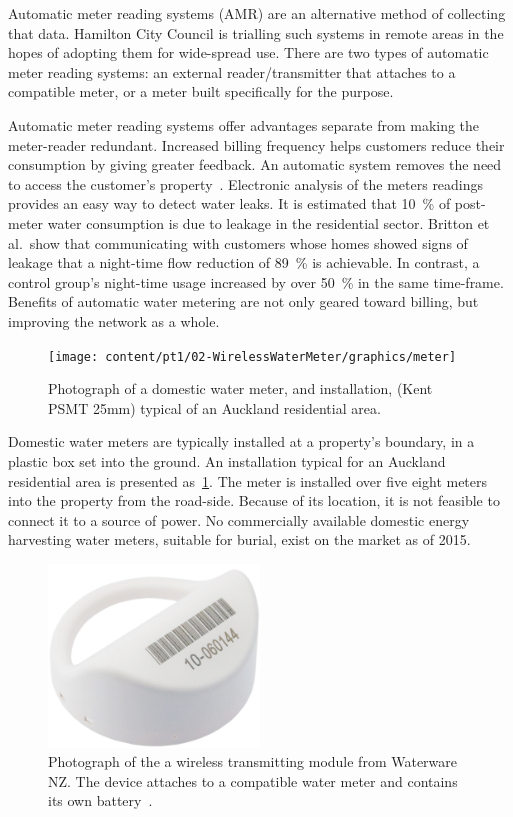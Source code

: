   Automatic meter reading systems (AMR) are an alternative method of collecting that data.
  Hamilton City Council is trialling such systems in remote areas in the hopes of adopting them for wide-spread use.
  There are two types of automatic meter reading systems:
  an external reader/transmitter that attaches to a compatible meter, or a meter built specifically for the purpose.

  Automatic meter reading systems offer advantages separate from making the meter-reader redundant.
  Increased billing frequency helps customers reduce their consumption by giving greater feedback.
  An automatic system removes the need to access the customer's property~\cite{Chang2012}.
  Electronic analysis of the meters readings provides an easy way to detect water leaks.
  It is estimated that \SI{10}{\percent} of post-meter water consumption is due to leakage in the residential sector.
  Britton et al.\ show that communicating with customers whose homes showed signs of leakage that a night-time flow reduction of \SI{89}{\percent} is achievable.
  In contrast, a control group's night-time usage increased by over \SI{50}{\percent} in the same time-frame.
  Benefits of automatic water metering are not only geared toward billing, but improving the network as a whole.

  \begin{figure}
    \centering
    \texttt{[image: content/pt1/02-WirelessWaterMeter/graphics/meter]}
    \caption{\label{fig:Photo_DomesticWaterMeter}Photograph of a domestic water meter, and installation, (Kent PSMT 25mm) typical of an Auckland residential area.}
  \end{figure}

  Domestic water meters are typically installed at a property's boundary, in a plastic box set into the ground.
  An installation typical for an Auckland residential area is presented as~\cref{fig:Photo_DomesticWaterMeter}.
  The meter is installed over five eight meters into the property from the road-side.
  Because of its location, it is not feasible to connect it to a source of power.
  No commercially available domestic energy harvesting water meters, suitable for burial, exist on the market as of 2015.

  \begin{figure}
    \centering
    \includegraphics[width=0.5\textwidth]{content/pt1/02-WirelessWaterMeter/graphics/hydro-WMBUSWLESSM}
    \caption{
      \label{fig:Photo_waterwareMeter}
      Photograph of the a wireless transmitting module from Waterware NZ.
      The device attaches to a compatible water meter and contains its own battery~\cite{BMeters2014}.
    }
  \end{figure}

